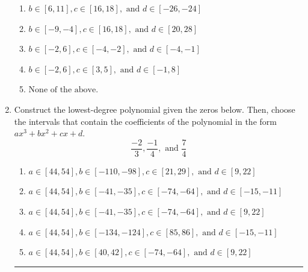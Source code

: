\documentclass[14pt]{extbook}
\newcommand{\litem}[1]{\item#1\hspace*{-1cm}\rule{\textwidth}{0.4pt}}
\begin{document}
\begin{enumerate}
{\begin{enumerate}[label=\Alph*.]
\item \( b \in [6, 11], c \in [16, 18], \text{ and } d \in [-26, -24] \)
\item \( b \in [-9, -4], c \in [16, 18], \text{ and } d \in [20, 28] \)
\item \( b \in [-2, 6], c \in [-4, -2], \text{ and } d \in [-4, -1] \)
\item \( b \in [-2, 6], c \in [3, 5], \text{ and } d \in [-1, 8] \)
\item \( \text{None of the above.} \)

\end{enumerate} }
\litem{
Construct the lowest-degree polynomial given the zeros below. Then, choose the intervals that contain the coefficients of the polynomial in the form $ax^3+bx^2+cx+d$.\[ \frac{-2}{3}, \frac{-1}{4}, \text{ and } \frac{7}{4} \]\begin{enumerate}[label=\Alph*.]
\item \( a \in [44, 54], b \in [-110, -98], c \in [21, 29], \text{ and } d \in [9, 22] \)
\item \( a \in [44, 54], b \in [-41, -35], c \in [-74, -64], \text{ and } d \in [-15, -11] \)
\item \( a \in [44, 54], b \in [-41, -35], c \in [-74, -64], \text{ and } d \in [9, 22] \)
\item \( a \in [44, 54], b \in [-134, -124], c \in [85, 86], \text{ and } d \in [-15, -11] \)
\item \( a \in [44, 54], b \in [40, 42], c \in [-74, -64], \text{ and } d \in [9, 22] \)


\end{enumerate}}
\end{enumerate}
\end{document}
